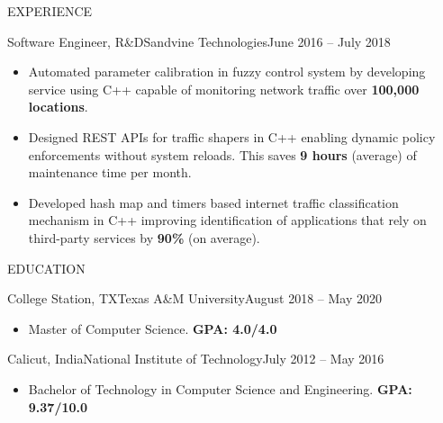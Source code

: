 \documentclass[]{mcdowellcv}
\begin{document}
\begin{cvsection}{EXPERIENCE}
		\begin{cvsubsection}{Software Engineer, R\&D}{Sandvine Technologies}{June 2016 -- July 2018}
			\begin{itemize}
				\item Automated parameter calibration in fuzzy control system by developing service using C++ capable of monitoring network traffic over \textbf{100,000 locations}.
				\item Designed REST APIs for traffic shapers in C++ enabling dynamic policy enforcements without system reloads. This saves \textbf{9 hours} (average) of maintenance time per month.
				\item Developed hash map and timers based internet traffic classification mechanism in C++ improving identification of applications that rely on third-party services by \textbf{90\%} (on average).
			\end{itemize}
		\end{cvsubsection}
	\end{cvsection}

	\begin{cvsection}{EDUCATION}
		\begin{cvsubsection}{College Station, TX}{Texas A\&M University}{August 2018 -- May 2020}
			\begin{itemize}
				\item Master of Computer Science. \textbf{GPA: 4.0/4.0}
			\end{itemize}
		\end{cvsubsection}
		
		\begin{cvsubsection}{Calicut, India}{National Institute of Technology}{July 2012 -- May 2016}
			\begin{itemize}
				\item Bachelor of Technology in Computer Science and Engineering. \textbf{GPA: 9.37/10.0}
			\end{itemize}
		\end{cvsubsection}
	\end{cvsection}
\end{document}
